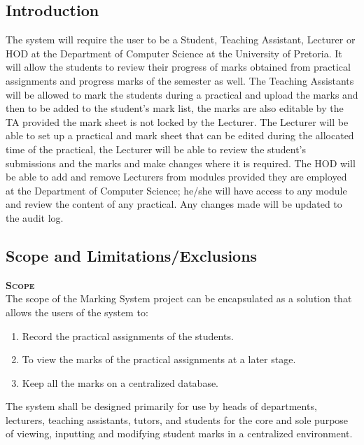 \documentclass[12pt, a4paper]{scrartcl}
\begin{document}
			\subsection{Introduction}
			The system will require the user to be a Student, Teaching Assistant, Lecturer or HOD at the Department of Computer Science at the University of Pretoria. It will allow the students to review their progress of marks obtained from practical assignments and progress marks of the semester as well. The Teaching Assistants will be allowed to mark the students during a practical and upload the marks and then to be added to the student’s mark list, the marks are also editable by the TA provided the mark sheet is not locked by the Lecturer. The Lecturer will be able to set up a practical and mark sheet that can be edited during the allocated time of the practical, the Lecturer will be able to review the student’s submissions and the marks and make changes where it is required. The HOD will be able to add and remove Lecturers from modules provided they are employed at the Department of Computer Science; he/she will have access to any module and review the content of any practical. Any changes made will be updated to the audit log.
			\subsection{Scope and Limitations/Exclusions}
				\textsc{\bf Scope}\\
					The scope of the Marking System project can be encapsulated as a solution that allows the users of the system to:
					\begin{enumerate}
						\item Record the practical assignments of the students.
						\item To view the marks of the practical assignments at a later stage.
						\item Keep all the marks on a centralized database.
					\end{enumerate}
					The system shall be designed primarily for use by heads of departments, lecturers, teaching assistants, tutors, and students for the core and sole purpose of viewing, inputting and modifying student marks in a centralized environment.
\end{document}
